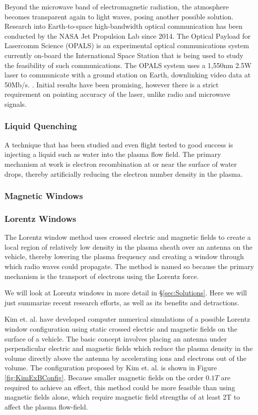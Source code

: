 \documentclass[twocolumn]{article}
\begin{document}
	Beyond the microwave band of electromagnetic radiation, the atmosphere becomes transparent again to light waves, posing another possible solution.
	Research into Earth-to-space high-bandwidth optical communication has been conducted by the NASA Jet Propulsion Lab since 2014.
	The Optical Payload for Lasercomm Science (OPALS) is an experimental optical communications system currently on-board the International Space Station that is being used to study the feasibility of such communications.
	The OPALS system uses a 1,550nm 2.5W laser to communicate with a ground station on Earth, downlinking video data at 50Mb/s. \cite{oaida_optical_2014}.
	Initial results have been promising, however there is a strict requirement on pointing accuracy of the laser, unlike radio and microwave signals. \cite{abrahamson_achieving_2015}
	
	\subsubsection*{Liquid Quenching}
	A technique that has been studied and even flight tested to good success is injecting a liquid such as water into the plasma flow field.
	The primary mechanism at work is electron recombination at or near the surface of water drops, thereby artificially reducing the electron number density in the plasma. %
	
	\subsubsection*{Magnetic Windows}
	
	
	\subsubsection*{Lorentz Windows}
	The Lorentz window method uses crossed electric and magnetic fields to create a local region of relatively low density in the plasma sheath over an antenna on the vehicle, thereby lowering the plasma frequency and creating a window through which radio waves could propagate.
	The method is named so because the primary mechanism is the transport of electrons using the Lorentz force.
	
	We will look at Lorentz windows in more detail in \S\ref{sec:Solutions}.
	Here we will just summarize recent research efforts, as well as its benefits and detractions.
	
	Kim et. al. have developed computer numerical simulations of a possible Lorentz window configuration using static crossed electric and magnetic fields on the surface of a vehicle.\cite{kim_plasma_2007}\cite{kim_analysis_2008}\cite{kim_modeling_2010}
	The basic concept involves placing an antenna under perpendicular electric and magnetic fields which reduce the plasma density in the volume directly above the antenna by accelerating ions and electrons out of the volume.
	The configuration proposed by Kim et. al. is shown in Figure \ref{fig:KimExBConfig}.
	Because smaller magnetic fields on the order $0.1 T$ are required to achieve an effect, this method could be more feasible than using magnetic fields alone, which require magnetic field strengths of at least 2T to affect the plasma flow-field.\cite{otsu_feasibility_2006}
	
\end{document}
